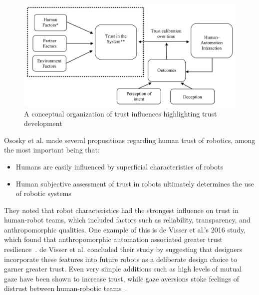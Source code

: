 \begin{figure}[b!]
    \begin{center}
        \includegraphics[width=0.8\linewidth]{figures/TradeStudy/figure4.png}
        \caption{A conceptual organization of trust influences highlighting trust development~\citep{schaefer_meta-analysis_2016}}
        \label{figure-hari:trust}
    \end{center}
\end{figure}

Ososky et al. made several propositions regarding human trust of robotics, among the most important being that:
\begin{itemize}
	\item Humans are easily influenced by superficial characteristics of robots
	\item Human subjective assessment of trust in robots ultimately determines the use of robotic systems~\citep{ososky_building_2013}
\end{itemize}
They noted that robot characteristics had the strongest influence on trust in human-robot teams, which included factors such as reliability, transparency, and anthropomorphic qualities.
One example of this is de Visser et al.'s 2016 study, which found that anthropomorphic automation associated greater trust resilience~\citep{de_visser_almost_2016}.
de Visser et al. concluded their study by suggesting that designers incorporate these features into future robots as a deliberate design choice to garner greater trust.
Even very simple additions such as high levels of mutual gaze have been shown to increase trust, while gaze aversions stoke feelings of distrust between human-robotic teams~\citep{admoni_social_2017}.

